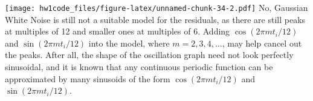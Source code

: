 \documentclass[
]{article}
\begin{document}
\texttt{[image: hw1code\_files/figure-latex/unnamed-chunk-34-2.pdf]} No,
Gaussian White Noise is still not a suitable model for the residuals, as
there are still peaks at multiples of 12 and smaller ones at multiples
of 6. Adding \(\cos(2\pi m t_i/12)\) and \(\sin(2\pi m t_i/12)\) into
the model, where \(m = 2,3,4, ...\), may help cancel out the peaks.
After all, the shape of the oscillation graph need not look perfectly
sinusoidal, and it is known that any continuous periodic function can be
approximated by many sinusoids of the form \(\cos(2\pi m t_i/12)\) and
\(\sin(2\pi m t_i/12)\).
\end{document}
